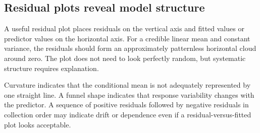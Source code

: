 \subsection{Residual plots reveal model structure}

A useful residual plot places residuals on the vertical axis and fitted values or predictor values on the horizontal axis. For a credible linear mean and constant variance, the residuals should form an approximately patternless horizontal cloud around zero. The plot does not need to look perfectly random, but systematic structure requires explanation.

Curvature indicates that the conditional mean is not adequately represented by one straight line. A funnel shape indicates that response variability changes with the predictor. A sequence of positive residuals followed by negative residuals in collection order may indicate drift or dependence even if a residual-versus-fitted plot looks acceptable.

